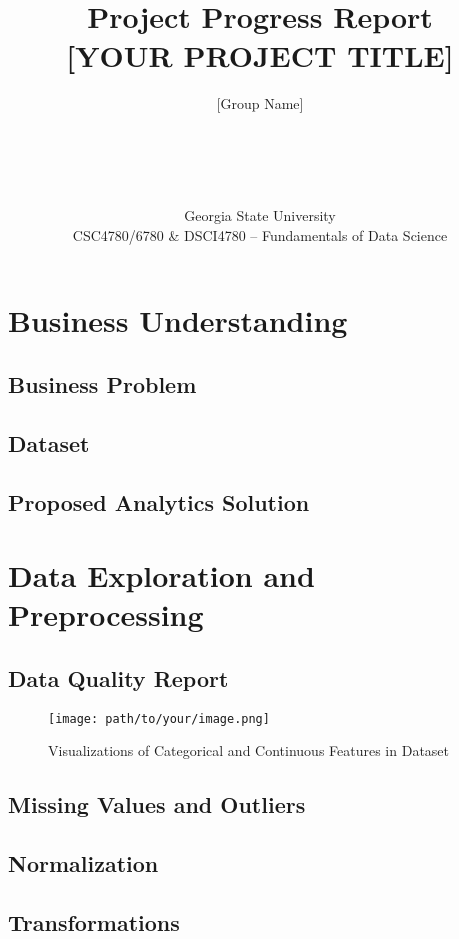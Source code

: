 \documentclass[12pt]{article}
\title{\vspace{-1.5cm}Project Progress Report \\ \large [YOUR PROJECT TITLE]}
\author{
[Group Name]\\
[Member 1]\\
[Member 2]\\
[Member 3]\\
[Member 4]\\
[Member 5]
}
\date{Georgia State University\\ CSC4780/6780 \& DSCI4780 – Fundamentals of Data Science \\ [Semester YEAR]}
\begin{document}
\maketitle
\newpage

\tableofcontents
\newpage

\section{Business Understanding}
\subsection{Business Problem}
\lipsum[1-2]

\subsection{Dataset}
\lipsum[3]

\subsection{Proposed Analytics Solution}
\lipsum[4-5]

\section{Data Exploration and Preprocessing}
\subsection{Data Quality Report}
\lipsum[6]

\begin{figure}[H]
\centering
\texttt{[image: path/to/your/image.png]}
\caption{Visualizations of Categorical and Continuous Features in Dataset}
\end{figure}

\subsection{Missing Values and Outliers}
\lipsum[7]

\subsection{Normalization}
\lipsum[8]

\subsection{Transformations}
\lipsum[9]
\end{document}
